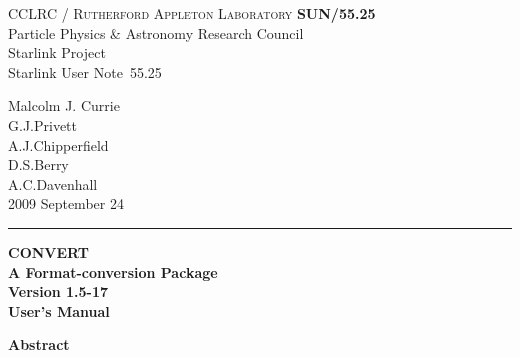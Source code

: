 \documentclass[twoside,11pt]{article}
\newcommand{\stardoccategory}  {Starlink User Note}
\newcommand{\stardocinitials}  {SUN}
\newcommand{\stardocnumber}    {55.25}
\newcommand{\stardocauthors}   {Malcolm J. Currie\\
                                G.J.Privett\\
                                A.J.Chipperfield\\
                                D.S.Berry\\
                                A.C.Davenhall}
\newcommand{\stardocdate}      {2009 September 24}
\newcommand{\stardoctitle}     {CONVERT\\
                                A Format-conversion Package}
\newcommand{\stardocversion}   {Version 1.5-17}
\newcommand{\stardocmanual}    {User's Manual}
\newcommand{\stardocname}{\stardocinitials /\stardocnumber}
\newenvironment{latexonly}{}{}
\begin{document}
\thispagestyle{empty}

\begin{latexonly}
   CCLRC / \textsc{Rutherford Appleton Laboratory} \hfill \textbf{\stardocname}\\
   {\large Particle Physics \& Astronomy Research Council}\\
   {\large Starlink Project\\}
   {\large \stardoccategory\ \stardocnumber}
   \begin{flushright}
   \stardocauthors\\
   \stardocdate
   \end{flushright}
   \vspace{-4mm}
   \rule{\textwidth}{0.5mm}
   \vspace{5mm}
   \begin{center}
   {\Huge\textbf{\stardoctitle \\ [2.5ex]}}
   {\LARGE\textbf{\stardocversion \\ [4ex]}}
   {\Huge\textbf{\stardocmanual}}
   \end{center}
   \vspace{5mm}


   \vspace{10mm}
   \begin{center}
      {\Large\textbf{Abstract}}
   \end{center}
\end{latexonly}
\end{document}
